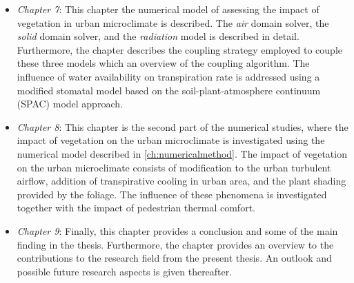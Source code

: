 \begin{itemize}
	\item \textit{Chapter 7}: This chapter the numerical model of assessing the impact of vegetation in urban microclimate is described. The \textit{air} domain solver, the \textit{solid} domain solver, and the \textit{radiation} model is described in detail. Furthermore, the chapter describes the coupling strategy employed to couple these three models which an overview of the coupling algorithm. The influence of water availability on transpiration rate is addressed using a modified stomatal model based on the soil-plant-atmosphere continuum (SPAC) model approach. 
	
	\item \textit{Chapter 8}: This chapter is the second part of the numerical studies, where the impact of vegetation on the urban microclimate is investigated using the numerical model described in \cref{ch:numericalmethod}. The impact of vegetation on the urban microclimate consists of modification to the urban turbulent airflow, addition of transpirative cooling in urban area, and the plant shading provided by the foliage. The influence of these phenomena is investigated together with the impact of pedestrian thermal comfort. 
	
	\item \textit{Chapter 9}: Finally, this chapter provides a conclusion and some of the main finding in the thesis. Furthermore, the chapter provides an overview to the contributions to the research field from the present thesis. An outlook and possible future research aspects is given thereafter.
	
\end{itemize}

